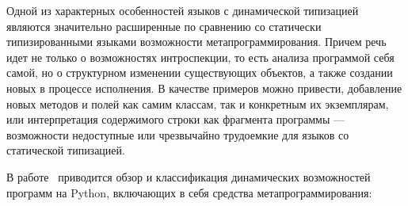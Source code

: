 Одной из характерных особенностей языков с динамической типизацией являются
значительно расширенные по сравнению со статически типизированными языками
возможности метапрограммирования. Причем речь идет не только о возможностях
интроспекции, то есть анализа программой себя самой, но о
структурном изменении существующих объектов, а также создании новых
в процессе исполнения. В качестве примеров можно привести, добавление новых
методов и полей как самим классам, так и конкретным их экземплярам, или
интерпретация содержимого строки как фрагмента программы --- возможности
недоступные или чрезвычайно трудоемкие для языков со статической типизацией.

В работе~\cite[]{Holkner2009} приводится обзор и классификация динамических
возможностей программ на Python, включающих в себя средства
метапрограммирования: 

